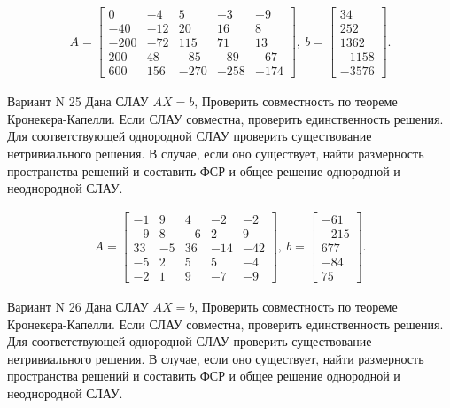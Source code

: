 \documentclass[11pt]{report}
\begin{document}
\begin{align*}
 A = \left[\begin{matrix}0 & -4 & 5 & -3 & -9\\-40 & -12 & 20 & 16 & 8\\-200 & -72 & 115 & 71 & 13\\200 & 48 & -85 & -89 & -67\\600 & 156 & -270 & -258 & -174\end{matrix}\right],
\ b = \left[\begin{matrix}34\\252\\1362\\-1158\\-3576\end{matrix}\right]. 
 \end{align*}

Вариант N 25
Дана СЛАУ $AX = b$,
Проверить совместность по теореме Кронекера-Капелли. Если СЛАУ совместна, проверить единственность решения.
Для соответствующей однородной СЛАУ проверить существование нетривиального решения. В случае, если оно существует,
найти размерность пространства решений и составить ФСР и общее решение однородной  и неоднородной СЛАУ.


\begin{align*}
 A = \left[\begin{matrix}-1 & 9 & 4 & -2 & -2\\-9 & 8 & -6 & 2 & 9\\33 & -5 & 36 & -14 & -42\\-5 & 2 & 5 & 5 & -4\\-2 & 1 & 9 & -7 & -9\end{matrix}\right],
\ b = \left[\begin{matrix}-61\\-215\\677\\-84\\75\end{matrix}\right]. 
 \end{align*}

Вариант N 26
Дана СЛАУ $AX = b$,
Проверить совместность по теореме Кронекера-Капелли. Если СЛАУ совместна, проверить единственность решения.
Для соответствующей однородной СЛАУ проверить существование нетривиального решения. В случае, если оно существует,
найти размерность пространства решений и составить ФСР и общее решение однородной  и неоднородной СЛАУ.
\end{document}
